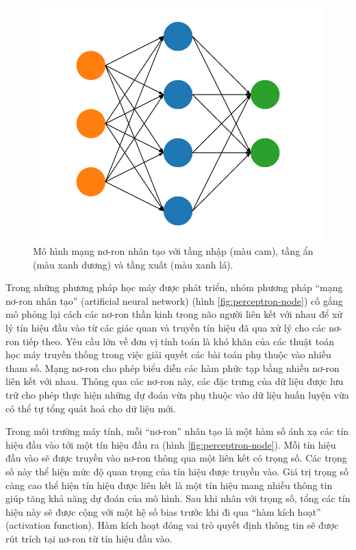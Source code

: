 \begin{figure}[htp]
	\centering
	\includegraphics[width=80 mm]{images/ann.png}
	\caption{Mô hình mạng nơ-ron nhân tạo với tầng nhập (màu cam), tầng ẩn (màu xanh dương) và tầng xuất (màu xanh lá).}
	\label{fig:ann}
\end{figure}

Trong những phương pháp học máy được phát triển, nhóm phương pháp ``mạng nơ-ron nhân tạo'' (artificial neural network) (hình \ref{fig:perceptron-node}) cố gắng mô phỏng lại cách các nơ-ron thần kinh trong não người liên kết với nhau để xử lý tín hiệu đầu vào từ các giác quan và truyền tín hiệu đã qua xử lý cho các nơ-ron tiếp theo. Yêu cầu lớn về đơn vị tính toán là khó khăn của các thuật toán học máy truyền thống trong việc giải quyết các bài toán phụ thuộc vào nhiều tham số. Mạng nơ-ron cho phép biểu diễn các hàm phức tạp bằng nhiều nơ-ron liên kết với nhau. Thông qua các nơ-ron này, các đặc trưng của dữ liệu được lưu trữ cho phép thực hiện những dự đoán vừa phụ thuộc vào dữ liệu huấn luyện vừa có thể tự tổng quát hoá cho dữ liệu mới.

Trong môi trường máy tính, mỗi ``nơ-ron'' nhân tạo là một hàm số ánh xạ các tín hiệu đầu vào tới một tín hiệu đầu ra (hình \ref{fig:perceptron-node}). Mỗi tín hiệu đầu vào sẽ được truyền vào nơ-ron thông qua một liên kết có trọng số. Các trọng số này thể hiện mức độ quan trọng của tín hiệu được truyền vào. Giá trị trọng số càng cao thể hiện tín hiệu được liên kết là một tín hiệu mang nhiều thông tin giúp tăng khả năng dự đoán của mô hình. Sau khi nhân với trọng số, tổng các tín hiệu này sẽ được cộng với một hệ số bias trước khi đi qua ``hàm kích hoạt'' (activation function). Hàm kích hoạt đóng vai trò quyết định thông tin sẽ được rút trích tại nơ-ron từ tín hiệu đầu vào.


